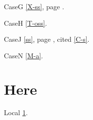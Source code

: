 \documentclass{article}
\begin{document}
CaseG \ref{X-ss}, page \pageref{X-front}.

CaseH \ref{T-oss}.

CaseJ \ref{ss}, page \pageref{front}, cited \ref{C-s}.

CaseN \ref{M-a}.

\section{Here}\label{here}
Local \ref{here}.
\end{document}
